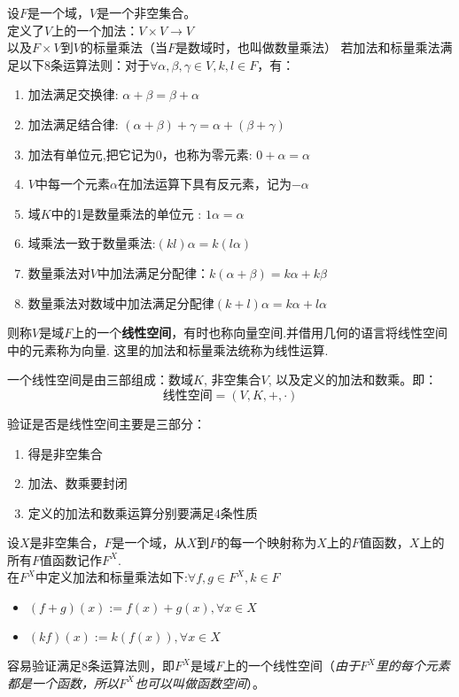 \begin{definition}
    设$F$是一个域，$V$是一个非空集合。\\
    定义了$V$上的一个加法：$V \times V \rightarrow V$\\
    以及$F \times V$到$V$的标量乘法（当$F$是数域时，也叫做数量乘法）
    若加法和标量乘法满足以下$8$条运算法则：对于$\forall \alpha, \beta, \gamma \in V, k, l \in F$，有：
    \begin{enumerate}
        \item 加法满足交换律: $\alpha + \beta = \beta + \alpha$
        \item 加法满足结合律: $(\alpha + \beta) + \gamma = \alpha + (\beta + \gamma)$
        \item 加法有单位元,把它记为$0$，也称为零元素: $0 + \alpha = \alpha$
        \item $V$中每一个元素$\alpha$在加法运算下具有反元素，记为$-\alpha$
        \item 域$K$中的1是数量乘法的单位元 : $1\alpha = \alpha$
        \item 域乘法一致于数量乘法:$(kl)\alpha = k(l\alpha)$
        \item 数量乘法对$V$中加法满足分配律：$k(\alpha + \beta) = k\alpha + k\beta$
        \item 数量乘法对数域中加法满足分配律$(k+l)\alpha = k\alpha + l\alpha$
    \end{enumerate}
    则称$V$是域$F$上的一个\textbf{线性空间}，有时也称向量空间.并借用几何的语言将线性空间中的元素称为向量.
    这里的加法和标量乘法统称为线性运算.
\end{definition}
\begin{remark}
    一个线性空间是由三部组成：数域$K$, 非空集合$V$, 以及定义的加法和数乘。即：
    \begin{equation*}
        \text{线性空间}=(V,K,+,\cdot)
    \end{equation*}
\end{remark}

\begin{remark}
    验证是否是线性空间主要是三部分：
    \begin{enumerate}
        \item 得是非空集合
        \item 加法、数乘要封闭
        \item 定义的加法和数乘运算分别要满足$4$条性质
    \end{enumerate}
\end{remark}

\begin{example}
    设$X$是非空集合，$F$是一个域，从$X$到$F$的每一个映射称为$X$上的$F$值函数，$X$上的所有$F$值函数记作$F^X$.\\
    在$F^X$中定义加法和标量乘法如下:$\forall f,g \in F^X, k \in F$
    \begin{itemize}
        \item $(f+g)(x) := f(x) + g(x), \forall x \in X$
        \item $(kf)(x) := k(f(x)), \forall x \in X$
    \end{itemize}
    容易验证满足$8$条运算法则，即$F^X$是域$F$上的一个线性空间（\emph{由于$F^X$里的每个元素都是一个函数，所以$F^X$也可以叫做函数空间}）。
\end{example}

